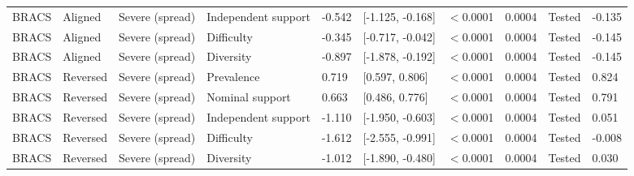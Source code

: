\begin{longtable}{llllllllll}
BRACS & Aligned & Severe (spread) & Independent support & -0.542 & [-1.125, -0.168] & $<$0.0001 & 0.0004 & Tested & -0.135 \\
BRACS & Aligned & Severe (spread) & Difficulty & -0.345 & [-0.717, -0.042] & $<$0.0001 & 0.0004 & Tested & -0.145 \\
BRACS & Aligned & Severe (spread) & Diversity & -0.897 & [-1.878, -0.192] & $<$0.0001 & 0.0004 & Tested & -0.145 \\
BRACS & Reversed & Severe (spread) & Prevalence & 0.719 & [0.597, 0.806] & $<$0.0001 & 0.0004 & Tested & 0.824 \\
BRACS & Reversed & Severe (spread) & Nominal support & 0.663 & [0.486, 0.776] & $<$0.0001 & 0.0004 & Tested & 0.791 \\
BRACS & Reversed & Severe (spread) & Independent support & -1.110 & [-1.950, -0.603] & $<$0.0001 & 0.0004 & Tested & 0.051 \\
BRACS & Reversed & Severe (spread) & Difficulty & -1.612 & [-2.555, -0.991] & $<$0.0001 & 0.0004 & Tested & -0.008 \\
BRACS & Reversed & Severe (spread) & Diversity & -1.012 & [-1.890, -0.480] & $<$0.0001 & 0.0004 & Tested & 0.030 \\
\end{longtable}
